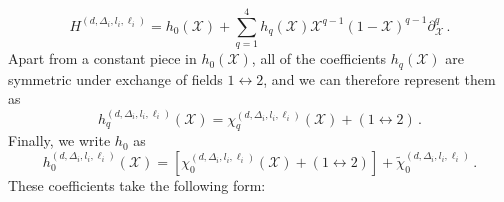 \documentclass{article}
\begin{document}
\begin{equation}
    H^{(d,\Delta_i,l_i,\ell_i)}=h_0(\mathcal{X})+\sum_{q=1}^4h_q(\mathcal{X})\mathcal{X}^{q-1}(1-\mathcal{X})^{q-1}\partial_{\mathcal{X}}^q\,.
    \label{H_basis}
\end{equation}
Apart from a constant piece in $h_0(\mathcal{X})$, all of the coefficients $h_q(\mathcal{X})$ are symmetric under exchange of fields $1\leftrightarrow 2$, and we can therefore represent them as
\begin{equation}
    h^{(d,\Delta_i,l_i,\ell_i)}_q(\mathcal{X})=\chi^{(d,\Delta_i,l_i,\ell_i)}_q(\mathcal{X})+(1\leftrightarrow 2)\,.
\end{equation}
Finally, we write $h_0$ as
\begin{equation}
    h^{(d,\Delta_i,l_i,\ell_i)}_0(\mathcal{X})=\left[\chi^{(d,\Delta_i,l_i,\ell_i)}_0(\mathcal{X})+(1\leftrightarrow 2)\right]+\tilde{\chi}_0^{(d,\Delta_i,l_i,\ell_i)}\,.
\end{equation}
These coefficients take the following form:
\end{document}
